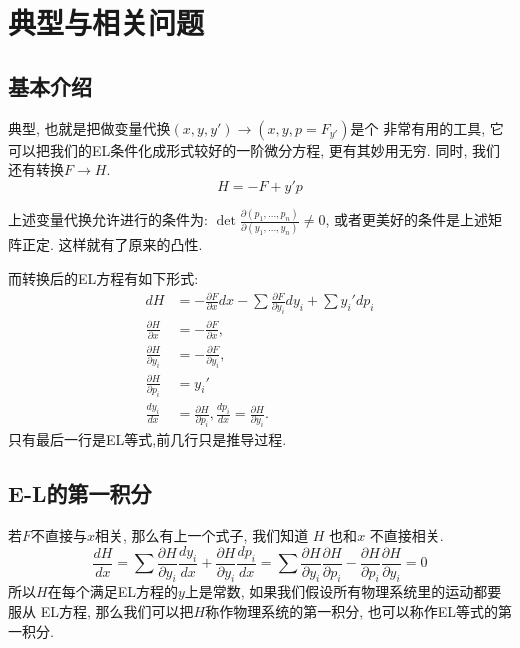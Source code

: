\section{典型与相关问题}

\subsection{基本介绍}

    典型, 也就是把做变量代换\((x,y,y') \to (x,y,p = F_{y'})\)是个
    非常有用的工具, 它可以把我们的EL条件化成形式较好的一阶微分方程,
    更有其妙用无穷. 同时, 我们还有转换\(F \to H\). 
    \[H = -F + y'p\]

    上述变量代换允许进行的条件为:
    \(\det\frac{\partial(p_1,\dots,p_n)}{\partial(y_1,\dots,y_n)} \ne 0\),
    或者更美好的条件是上述矩阵正定. 这样就有了原来的凸性. 

    而转换后的EL方程有如下形式:
    \begin{equation}
        \begin{aligned}
            dH &= - \frac{\partial F}{\partial x}dx - \sum \frac{\partial F}{\partial y_i}dy_i +\sum y_i' dp_i \\
            \frac{\partial H}{\partial x} &= -\frac{\partial F}{\partial x}, \\
            \frac{\partial H}{\partial y_i} &= -\frac{\partial F}{\partial y_i}, \\
            \frac{\partial H}{\partial p_i} &= y_i' \\
            \frac{dy_i}{dx} &= \frac{\partial H}{\partial p_i}, 
            \frac{dp_i}{dx} = \frac{\partial H}{\partial y_i}. 
        \end{aligned}
    \end{equation}
    只有最后一行是EL等式,前几行只是推导过程. 


\subsection{E-L的第一积分}

若\(F\)不直接与\(x\)相关, 那么有上一个式子, 我们知道 \(H\) 也和\(x\) 不直接相关.
\[
\frac{dH}{dx} 
    = \sum  \frac{\partial H}{\partial y_i}\frac{dy_i}{dx} 
        +   \frac{\partial H}{\partial y_i}\frac{dp_i}{dx} 
    = \sum  \frac{\partial H}{\partial y_i}\frac{\partial H}{\partial p_i}
        -   \frac{\partial H}{\partial p_i}\frac{\partial H}{\partial y_i}
    = 0
\]
所以\(H\)在每个满足EL方程的\(y\)上是常数, 如果我们假设所有物理系统里的运动都要服从
EL方程, 那么我们可以把\(H\)称作物理系统的第一积分, 也可以称作EL等式的第一积分. 

